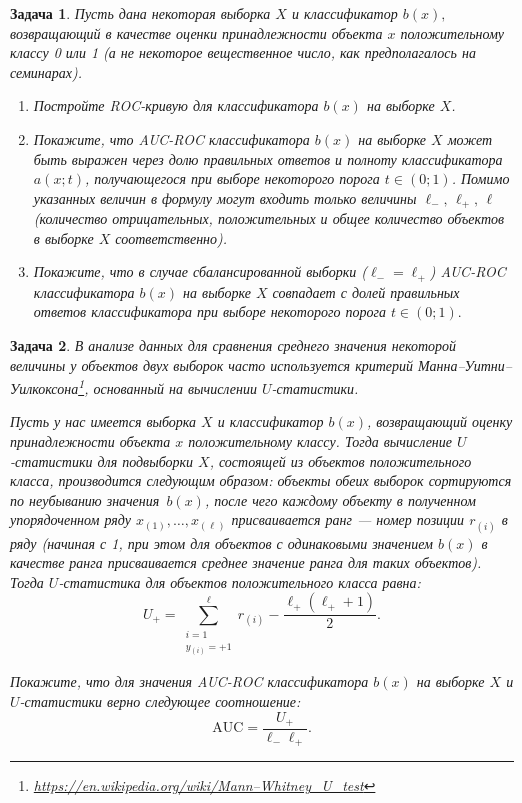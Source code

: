 \documentclass[12pt,fleqn]{article}
\newtheorem{esProblem}{Задача}
\begin{document}
\begin{esProblem}
	Пусть дана некоторая выборка $X$ и классификатор $b(x),$ возвращающий в качестве оценки принадлежности объекта  $x$ положительному классу 0 или 1 (а не некоторое вещественное число, как предполагалось на семинарах).
	\begin{enumerate}
	\item Постройте ROC-кривую для классификатора $b(x)$ на выборке $X$.
	\item Покажите, что AUC-ROC классификатора $b(x)$ на выборке $X$ может быть выражен через долю правильных ответов и полноту классификатора $a(x; t)$, получающегося при выборе некоторого порога $t \in (0; 1)$. Помимо указанных величин в формулу могут входить только величины $\ell_-, \, \ell_+, \, \ell$ (количество отрицательных, положительных и общее количество объектов в выборке  $X$ соответственно).
	\item Покажите, что в случае сбалансированной выборки ($\ell_- = \ell_+$) AUC-ROC классификатора $b(x)$ на выборке $X$ совпадает с долей правильных ответов классификатора при выборе некоторого порога $t \in (0;1).$
	\end{enumerate} 
\end{esProblem}


\begin{esProblem}
	В анализе данных для сравнения среднего значения некоторой величины у объектов двух выборок часто используется критерий Манна–Уитни–Уилкоксона\footnote{\href{https://en.wikipedia.org/wiki/Mann\%2dWhitney\_U\_test}{https://en.wikipedia.org/wiki/Mann–Whitney\_U\_test}}, основанный на вычислении $U$-статистики.
	\par Пусть у нас имеется выборка $X$ и классификатор $b(x)$, возвращающий оценку принадлежности объекта $x$ положительному классу. Тогда вычисление $U$-статистики для подвыборки $X$, состоящей из объектов положительного класса, производится следующим образом: объекты обеих выборок сортируются по неубыванию значения~$b(x)$, после чего каждому объекту в полученном упорядоченном ряду $x_{(1)}, \dots, x_{(\ell)}$ присваивается ранг — номер позиции $r_{(i)}$ в ряду (начиная с 1, при этом для объектов с одинаковыми значением $b(x)$ в качестве ранга присваивается среднее значение ранга для таких объектов). Тогда $U$-статистика для объектов положительного класса равна:
	$$U_+ = \sum_{\substack{i= 1 \\ y_{(i)} = +1}}^\ell r_{(i)} - \frac{\ell_+ (\ell_+ + 1)}{2}.$$
	\par Покажите, что для значения AUC-ROC классификатора $b(x)$ на выборке $X$ и $U$-статистики верно следующее соотношение:
	$$\text{AUC} = \frac{U_+}{\ell_- \ell_+}.$$
\end{esProblem}
\end{document}
